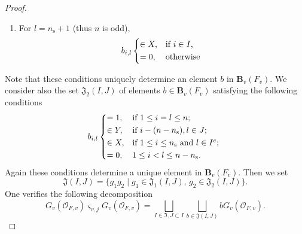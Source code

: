 \documentclass[12pt,oneside,reqno]{amsart}
\theoremstyle{plain}
\begin{document}
\begin{proof}
\begin{enumerate}
			\item 
			For
			$l=n_\mathrm{s}+1$
			(thus $n$ is odd),
			\[
			b_{i,l}
			\begin{cases*}
				\in X,
				&
				if
				$i\in I$,
				\\
				=0,
				&
				otherwise
			\end{cases*}
			\]
		\end{enumerate}
		Note that these conditions uniquely determine an element $b$ in $\mathbf{B}_v(F_v)$. We consider also the set $\mathfrak{J}_2(I,J)$
		of elements $b\in\mathbf{B}_v(F_v)$ satisfying the following conditions
		\[
		b_{i,l}
		\begin{cases*}
			=1,
			&
			if
			$1\leq i=l\leq n$;
			\\
			\in
			Y,
			&
			if
			$i-(n-n_\mathrm{s}),l\in J$;
			\\
			\in
			X,
			&
			if
			$1\leq i\leq n_\mathrm{s}$
			and
			$l\in I^c$;
			\\
			=0,
			&
			$1\leq i<l\leq n-n_\mathrm{s}$.
		\end{cases*}
		\]
		Again these conditions determine a unique element in
		$\mathbf{B}_v(F_v)$.
		Then we set
		\[
		\mathfrak{J}(I,J)
		=
		\{
		g_1g_2\mid 
		g_1\in\mathfrak{J}_1(I,J),
		\,
		g_2\in\mathfrak{J}_2(I,J)
		\}.
		\]
		One verifies the following decomposition
		\[
		G_v(\mathcal{O}_{F,v})
		\varsigma_{v,j}
		G_v(\mathcal{O}_{F,v})
		=
		\bigsqcup_{I\in\mathfrak{I},J\subset I}
		\bigsqcup_{b\in \mathfrak{J}(I,J)}
		b G_v(\mathcal{O}_{F,v}).
		\]
		
		
		

\end{proof}
\end{document}
